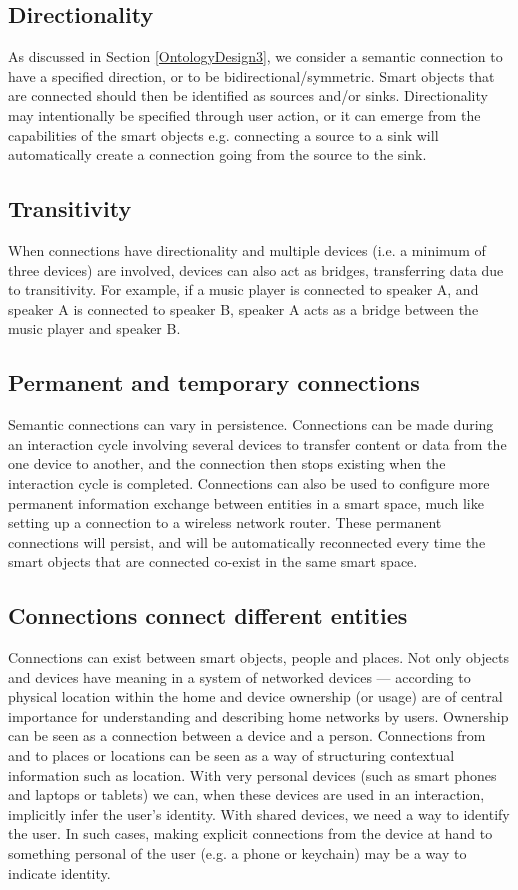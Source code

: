 \subsection{Directionality}
\label{directionality}
As discussed in Section \ref{OntologyDesign3}, we consider a semantic connection to have a specified direction, or to be bidirectional/symmetric. Smart objects that are connected should then be identified as sources and/or sinks. Directionality may intentionally be specified through user action, or it can emerge from the capabilities of the smart objects e.g. connecting a source to a sink will automatically create a connection going from the source to the sink.

\subsection{Transitivity}
When connections have directionality and multiple devices (i.e. a minimum of three devices) are involved, devices can also act as bridges, transferring data due to transitivity. For example, if a music player is connected to speaker A, and speaker A is connected to speaker B, speaker A acts as a bridge between the music player and speaker B.

\subsection{Permanent and temporary connections}
Semantic connections can vary in persistence. Connections can be made during an interaction cycle involving several devices to transfer content or data from the one device to another, and the connection then stops existing when the interaction cycle is completed. Connections can also be used to configure more permanent information exchange between entities in a smart space, much like setting up a connection to a wireless network router. These permanent connections will persist, and will be automatically reconnected every time the smart objects that are connected co-exist in the same smart space.

\subsection{Connections connect different entities}
Connections can exist between smart objects, people and places. Not only objects and devices have meaning in a system of networked devices --- according to \cite{Poole2008} physical location within the home and device ownership (or usage) are of central importance for understanding and describing home networks by users. Ownership can be seen as a connection between a device and a person. Connections from and to places or locations can be seen as a way of structuring contextual information such as location. With very personal devices (such as smart phones and laptops or tablets) we can, when these devices are used in an interaction, implicitly infer the user's identity. With shared devices, we need a way to identify the user. In such cases, making explicit connections from the device at hand to something personal of the user (e.g. a phone or keychain) may be a way to indicate identity.


